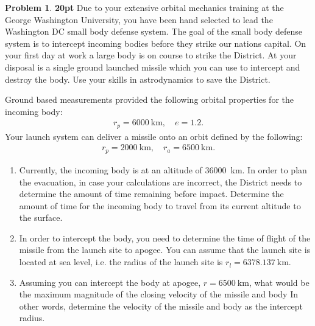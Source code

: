 \documentclass[10pt]{article}
\theoremstyle{definition}
\newtheorem{prob}{Problem}[section]
\newenvironment{subprob}%
{\renewcommand{\theenumi}{\alph{enumi}}\renewcommand{\labelenumi}{(\theenumi)}\begin{enumerate}}%
{\end{enumerate}}%
\begin{document}
\begin{prob}
    \textbf{20pt}
    Due to your extensive orbital mechanics training at the George Washington University, you have been hand selected to lead the Washington DC small body defense system. 
    The goal of the small body defense system is to intercept incoming bodies before they strike our nations capital. 
    On your first day at work a large body is on course to strike the District. 
    At your disposal is a single ground launched missile which you can use to intercept and destroy the body. 
    Use your skills in astrodynamics to save the District. 

    Ground based measurements provided the following orbital properties for the incoming body:
    \begin{align}
        r_p = \SI{6000}{\kilo\meter}, \quad e = 1.2.
    \end{align}
    Your launch system can deliver a missile onto an orbit defined by the following:
    \begin{align}
        r_p = \SI{2000}{\kilo\meter}, \quad r_a = \SI{6500}{\kilo\meter} .
    \end{align}

\begin{subprob}
    \item Currently, the incoming body is at an altitude of \SI{36000}{\kilo\meter}.
        In order to plan the evacuation, in case your calculations are incorrect, the District needs to determine the amount of time remaining before impact.
        Determine the amount of time for the incoming body to travel from its current altitude to the surface.
    \item In order to intercept the body, you need to determine the time of flight of the missile from the launch site to apogee. 
        You can assume that the launch site is located at sea level, i.e. the radius of the launch site is \( r_l = \SI{6378.137}{\kilo\meter}\).
    \item Assuming you can intercept the body at apogee, \( r = \SI{6500}{\kilo\meter} \), what would be the maximum magnitude of the closing velocity of the missile and body
        In other words, determine the velocity of the missile and body as the intercept radius.
\end{subprob}
\end{prob}
\end{document}
